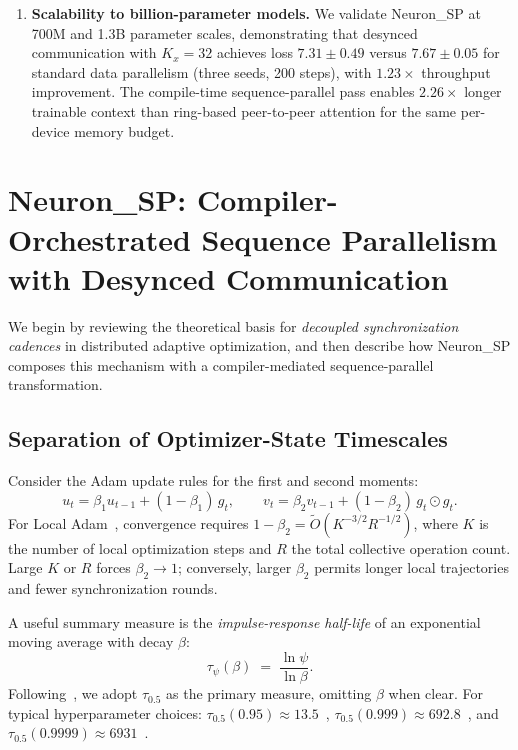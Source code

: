 \documentclass{article}
\begin{document}
\begin{enumerate}
    \item \textbf{Scalability to billion-parameter models.}
    We validate Neuron\_SP at 700M and 1.3B parameter scales, demonstrating that desynced
    communication with $K_x = 32$ achieves loss $7.31 \pm 0.49$ versus
    $7.67 \pm 0.05$ for standard data parallelism (three seeds, 200 steps), with
    $1.23\times$ throughput improvement. The compile-time sequence-parallel pass enables
    $2.26\times$ longer trainable context than ring-based peer-to-peer attention for the same
    per-device memory budget.
\end{enumerate}


\section{Neuron\_SP: Compiler-Orchestrated Sequence Parallelism with Desynced Communication}
\label{sec:desloc}

We begin by reviewing the theoretical basis for \emph{decoupled synchronization
cadences} in distributed adaptive optimization, and then describe how
Neuron\_SP composes this mechanism with a compiler-mediated
sequence-parallel transformation.

\subsection{Separation of Optimizer-State Timescales}
\label{sec:timescales}

Consider the Adam update rules for the first and second moments:
\begin{equation}
u_t = \beta_1 u_{t-1} + (1 - \beta_1)\, g_t, \qquad
v_t = \beta_2 v_{t-1} + (1 - \beta_2)\, g_t \odot g_t.
\end{equation}
For Local Adam~\citep{cheng2025convergence}, convergence requires
$1 - \beta_2 = \tilde{O}(K^{-3/2} R^{-1/2})$, where $K$ is the number of
local optimization steps and $R$ the total collective operation count.
Large $K$ or $R$ forces $\beta_2 \to 1$; conversely, larger $\beta_2$ permits
longer local trajectories and fewer synchronization rounds.

A useful summary measure is the \emph{impulse-response half-life} of an
exponential moving average with decay $\beta$:
\begin{equation}
\tau_\psi(\beta) \;=\; \frac{\ln \psi}{\ln \beta}.
\end{equation}
Following~\citet{pagliardini2025ademamix}, we adopt $\tau_{0.5}$ as the primary
measure, omitting $\beta$ when clear. For typical hyperparameter choices:
$\tau_{0.5}(0.95) \approx 13.5$~\citep{allal2025smollm2},
$\tau_{0.5}(0.999) \approx 692.8$~\citep{kingma2015adam}, and
$\tau_{0.5}(0.9999) \approx 6931$~\citep{taniguchi2024adopt}.
\end{document}

